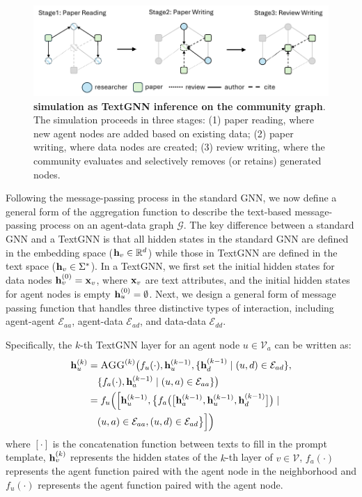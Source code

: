 \begin{figure}[t]
    \centering
    \includegraphics[width=0.82\linewidth]{./figs/community_activity.pdf}
    \caption{\textbf{\envname simulation as TextGNN inference on the community graph}. The simulation proceeds in three stages: (1) paper reading, where new agent nodes are added based on existing data; (2) paper writing, where data nodes are created; (3) review writing, where the community evaluates and selectively removes (or retains) generated nodes.}
    \label{fig:community-activity}
    \vspace{-2mm}
\end{figure}


 Following the message-passing process in the standard GNN, we now define a general form of the aggregation function to describe the text-based message-passing process on an agent-data graph $\mathcal{G}$. The key difference between a standard GNN and a TextGNN is that all hidden states in the standard GNN are defined in the embedding space ($\mathbf{h}_v \in \mathbb{R}^d$) while those in TextGNN are defined in the text space ($\mathbf{h}_v \in \Sigma^{*}$). In a TextGNN, we first set the initial hidden states for data nodes $\mathbf{h}_v^{(0)} = \mathbf{x}_v$, where $\mathbf{x}_v$ are text attributes, and the initial hidden states for agent nodes is empty $\mathbf{h}_u^{(0)} = \emptyset$. Next, we design a general form of message passing function that handles three distinctive types of interaction, including agent-agent $\mathcal{E}_{aa}$, agent-data $\mathcal{E}_{ad}$, and data-data $\mathcal{E}_{dd}$.

Specifically, the $k$-th TextGNN layer for an agent node $u\in \mathcal{V}_a$ can be written as:
\begingroup
\small
\begin{equation}
\begin{aligned}
    \mathbf{h}_{u}^{(k)} &= \textsc{AGG}^{(k)}\big(f_u(\cdot), \mathbf{h}_u^{(k-1)}, \{\mathbf{h}_d^{(k-1)} \mid (u,d) \in \mathcal{E}_{ad}\}, \\
    &\quad \{f_a(\cdot), \mathbf{h}_a^{(k-1)} \mid (u,a) \in \mathcal{E}_{aa}\}\big) \\
    &= f_u\Big(\Big[\mathbf{h}_u^{(k-1)}, \big\{f_a\big(\big[\mathbf{h}_a^{(k-1)}, \mathbf{h}_u^{(k-1)}, \mathbf{h}_d^{(k-1)}\big]\big) \mid \\
    &\quad (u,a) \in \mathcal{E}_{aa}, (u,d) \in \mathcal{E}_{ad}\big\}\Big]\Big)
\end{aligned}
\label{agg_agent}
\end{equation}
\endgroup
where $[\cdot]$ is the concatenation function between texts to fill in the prompt template, $\mathbf{h}_v^{(k)}$ represents the hidden states of the $k$-th layer of $v\in \mathcal{V}$, $f_a(\cdot)$ represents the agent function paired with the agent node in the neighborhood and $f_u(\cdot)$ represents the agent function paired with the agent node.


